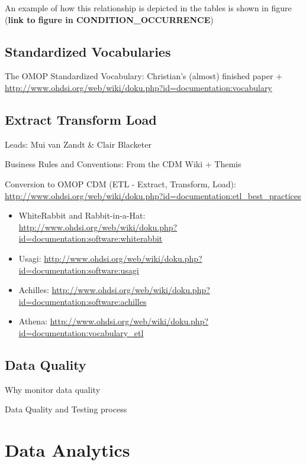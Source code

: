 \documentclass[]{book}
\providecommand{\tightlist}{%
  \setlength{\itemsep}{0pt}\setlength{\parskip}{0pt}}
\begin{document}
An example of how this relationship is depicted in the tables is shown
in figure (\textbf{link to figure in CONDITION\_OCCURRENCE})

\chapter{Standardized Vocabularies}\label{StandardizedVocabularies}

The OMOP Standardized Vocabulary: Christian's (almost) finished paper +
\url{http://www.ohdsi.org/web/wiki/doku.php?id=documentation:vocabulary}

\chapter{Extract Transform Load}\label{ExtractTransformLoad}

Leads: Mui van Zandt \& Clair Blacketer

Business Rules and Conventions: From the CDM Wiki + Themis

Conversion to OMOP CDM (ETL - Extract, Transform, Load):
\url{http://www.ohdsi.org/web/wiki/doku.php?id=documentation:etl_best_practices}

\begin{itemize}
\tightlist
\item
  WhiteRabbit and Rabbit-in-a-Hat:
  \url{http://www.ohdsi.org/web/wiki/doku.php?id=documentation:software:whiterabbit}
\item
  Usagi:
  \url{http://www.ohdsi.org/web/wiki/doku.php?id=documentation:software:usagi}
\item
  Achilles:
  \url{http://www.ohdsi.org/web/wiki/doku.php?id=documentation:software:achilles}
\item
  Athena:
  \url{http://www.ohdsi.org/web/wiki/doku.php?id=documentation:vocabulary_etl}
\end{itemize}

\chapter{Data Quality}\label{DataQuality}

Why monitor data quality

Data Quality and Testing process

\part{Data Analytics}\label{part-data-analytics}
\end{document}
